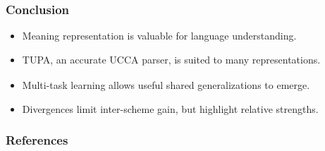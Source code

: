 \documentclass[t,xcolor={svgnames,table}]{beamer}
\newcommand{\parser}[1]{TUPA\textsubscript{#1}}
\begin{document}
\begin{frame}

\end{frame}


\section*{}

\begin{frame}
\frametitle{Conclusion}
\begin{itemize}
 \item Meaning representation is valuable for language understanding.\pause
 \item \parser{}, an accurate UCCA parser, is suited to many representations.\pause
 \item Multi-task learning allows useful shared generalizations to emerge.\pause
 \item Divergences limit inter-scheme gain, but highlight relative strengths.\pause
\end{itemize}

\end{frame}

\begin{frame}[allowframebreaks]
\frametitle{References}

\tiny
\end{frame}
\end{document}
